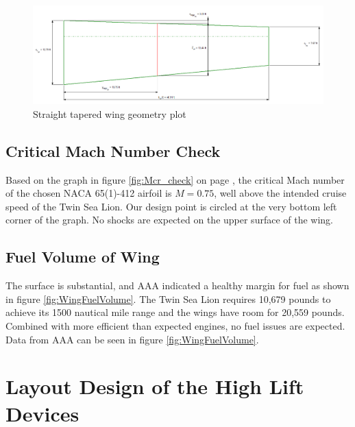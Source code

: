 \documentclass[conf]{new-aiaa}
\begin{document}
\begin{figure}[H]
	\centering
	\includegraphics[width=\textwidth]{TwinSeaLionReport2Printouts/StraightTaperedWingGeometryPlot}
	\caption{Straight tapered wing geometry plot}
	\label{fig:StraightTaperedWingGeometryPlot}
\end{figure}

\subsection{Critical Mach Number Check}
Based on the graph in figure \ref{fig:Mcr_check} on page \pageref{fig:Mcr_check}, the critical Mach number of the chosen NACA 65(1)-412 airfoil is $M=0.75$, well above the intended cruise speed of the Twin Sea Lion. Our design point is circled at the very bottom left corner of the graph. No shocks are expected on the upper surface of the wing.

\subsection{Fuel Volume of Wing}
The surface is substantial, and AAA indicated a healthy margin for fuel as shown in figure \ref{fig:WingFuelVolume}. The Twin Sea Lion requires 10,679 pounds to achieve its 1500 nautical mile range and the wings have room for 20,559 pounds. Combined with more efficient than expected engines, no fuel issues are expected. Data from AAA can be seen in figure \ref{fig:WingFuelVolume}.

\section{Layout Design of the High Lift Devices}
\end{document}
